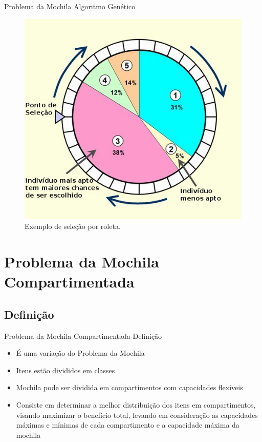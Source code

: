 \documentclass[slidestop,compress,mathserif]{beamer}
\begin{document}
\begin{frame} {Problema da Mochila} {Algoritmo Genético}

\begin{figure}[htp]
	\centering
	\includegraphics[scale=0.3]{images/roleta.jpg}
	\caption{Exemplo de seleção por roleta.}
	\label{fig:roleta}
\end{figure}

\end{frame}


\section{Problema da Mochila Compartimentada}
\subsection{Definição}
\begin{frame} {Problema da Mochila Compartimentada} {Definição}

\begin{itemize}
 \item É uma variação do Problema da Mochila
 \item Itens estão divididos em classes
 \item Mochila pode ser dividida em compartimentos com capacidades flexíveis 
\item Consiste em determinar a melhor distribuição dos itens em compartimentos, visando maximizar o benefício total, levando em consideração as capacidades máximas e mínimas de cada compartimento e a capacidade máxima da mochila
\end{itemize}

\end{frame}
\end{document}
